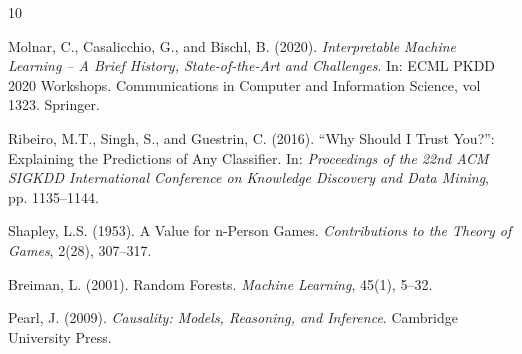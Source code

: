\documentclass[11pt,a4paper]{article}
\theoremstyle{definition}
\begin{document}

\begin{thebibliography}{10}

Molnar, C., Casalicchio, G., and Bischl, B. (2020).
\textit{Interpretable Machine Learning -- A Brief History, State-of-the-Art and Challenges}.
In: ECML PKDD 2020 Workshops. Communications in Computer and Information Science, vol 1323. Springer.

Ribeiro, M.T., Singh, S., and Guestrin, C. (2016).
``Why Should I Trust You?'': Explaining the Predictions of Any Classifier.
In: \textit{Proceedings of the 22nd ACM SIGKDD International Conference on Knowledge Discovery and Data Mining}, pp. 1135--1144.

Shapley, L.S. (1953).
A Value for n-Person Games.
\textit{Contributions to the Theory of Games}, 2(28), 307--317.

Breiman, L. (2001).
Random Forests.
\textit{Machine Learning}, 45(1), 5--32.

Pearl, J. (2009).
\textit{Causality: Models, Reasoning, and Inference}.
Cambridge University Press.

\end{thebibliography}
\end{document}
